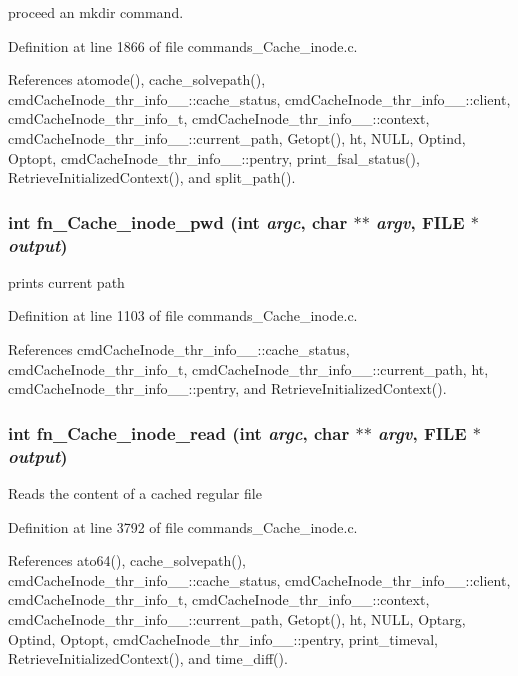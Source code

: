 proceed an mkdir command. 

Definition at line 1866 of file commands\_\-Cache\_\-inode.c.

References atomode(), cache\_\-solvepath(), cmd\-Cache\-Inode\_\-thr\_\-info\_\-\_\-::cache\_\-status, cmd\-Cache\-Inode\_\-thr\_\-info\_\-\_\-::client, cmd\-Cache\-Inode\_\-thr\_\-info\_\-t, cmd\-Cache\-Inode\_\-thr\_\-info\_\-\_\-::context, cmd\-Cache\-Inode\_\-thr\_\-info\_\-\_\-::current\_\-path, Getopt(), ht, NULL, Optind, Optopt, cmd\-Cache\-Inode\_\-thr\_\-info\_\-\_\-::pentry, print\_\-fsal\_\-status(), Retrieve\-Initialized\-Context(), and split\_\-path().
\subsubsection{\setlength{\rightskip}{0pt plus 5cm}int fn\_\-Cache\_\-inode\_\-pwd (int {\em argc}, char $\ast$$\ast$ {\em argv}, FILE $\ast$ {\em output})}\label{commands__Cache__inode_8c_a29}


prints current path 

Definition at line 1103 of file commands\_\-Cache\_\-inode.c.

References cmd\-Cache\-Inode\_\-thr\_\-info\_\-\_\-::cache\_\-status, cmd\-Cache\-Inode\_\-thr\_\-info\_\-t, cmd\-Cache\-Inode\_\-thr\_\-info\_\-\_\-::current\_\-path, ht, cmd\-Cache\-Inode\_\-thr\_\-info\_\-\_\-::pentry, and Retrieve\-Initialized\-Context().
\subsubsection{\setlength{\rightskip}{0pt plus 5cm}int fn\_\-Cache\_\-inode\_\-read (int {\em argc}, char $\ast$$\ast$ {\em argv}, FILE $\ast$ {\em output})}\label{commands__Cache__inode_8c_a48}


Reads the content of a cached regular file 

Definition at line 3792 of file commands\_\-Cache\_\-inode.c.

References ato64(), cache\_\-solvepath(), cmd\-Cache\-Inode\_\-thr\_\-info\_\-\_\-::cache\_\-status, cmd\-Cache\-Inode\_\-thr\_\-info\_\-\_\-::client, cmd\-Cache\-Inode\_\-thr\_\-info\_\-t, cmd\-Cache\-Inode\_\-thr\_\-info\_\-\_\-::context, cmd\-Cache\-Inode\_\-thr\_\-info\_\-\_\-::current\_\-path, Getopt(), ht, NULL, Optarg, Optind, Optopt, cmd\-Cache\-Inode\_\-thr\_\-info\_\-\_\-::pentry, print\_\-timeval, Retrieve\-Initialized\-Context(), and time\_\-diff().

